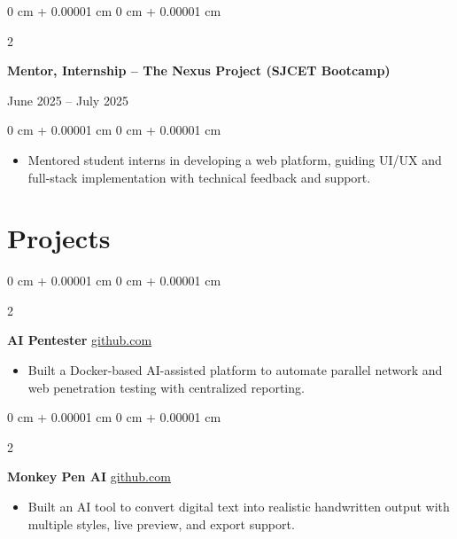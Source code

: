 \documentclass[10pt, a4paper]{article}
\newenvironment{highlights}{
    \begin{itemize}[
        topsep=0.10 cm,
        parsep=0.10 cm,
        partopsep=0pt,
        itemsep=0pt,
        leftmargin=0 cm + 10pt
    ]
}{
    \end{itemize}
} %
\newenvironment{onecolentry}{
    \begin{adjustwidth}{
        0 cm + 0.00001 cm
    }{
        0 cm + 0.00001 cm
    }
}{
    \end{adjustwidth}
} %
\newenvironment{twocolentry}[2][]{
    \onecolentry
    \def\secondColumn{#2}
    \setcolumnwidth{\fill, 4.5 cm}
    \begin{paracol}{2}
}{
    \switchcolumn \raggedleft \secondColumn
    \end{paracol}
    \endonecolentry
} %
\begin{document}
\vspace{0.2 cm}

\begin{twocolentry}{
    June 2025 – July 2025
}
    \textbf{Mentor, Internship – The Nexus Project (SJCET Bootcamp)}
\end{twocolentry}

\vspace{0.10 cm}
\begin{onecolentry}
    \begin{highlights}
        \item Mentored student interns in developing a web platform, guiding UI/UX and full-stack implementation with technical feedback and support.
    \end{highlights}
\end{onecolentry}

    \section{Projects}

            \begin{twocolentry}{
            \href{https://github.com/TimsTittus/AI-Pentester}{github.com}
        }
            \textbf{AI Pentester}\end{twocolentry}

        \vspace{0.01 cm}
        
            \begin{highlights}
                \item Built a Docker-based AI-assisted platform to automate parallel network and web penetration testing with centralized reporting.
            \end{highlights}

            \begin{twocolentry}{
            \href{https://github.com/TimsTittus/AI-Pentester}{github.com}
        }
            \textbf{Monkey Pen AI}\end{twocolentry}

        \vspace{0.01 cm}
        
            \begin{highlights}
                \item Built an AI tool to convert digital text into realistic handwritten output with multiple styles, live preview, and export support.
            \end{highlights}
            
\end{document}
